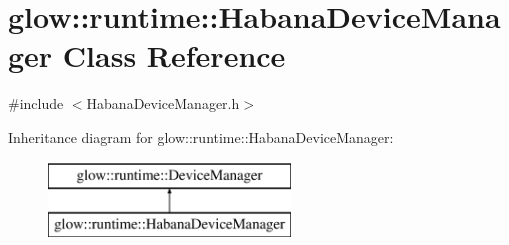 \hypertarget{classglow_1_1runtime_1_1_habana_device_manager}{}\section{glow\+:\+:runtime\+:\+:Habana\+Device\+Manager Class Reference}
\label{classglow_1_1runtime_1_1_habana_device_manager}


{\ttfamily \#include $<$Habana\+Device\+Manager.\+h$>$}

Inheritance diagram for glow\+:\+:runtime\+:\+:Habana\+Device\+Manager\+:\begin{figure}[H]
\begin{center}
\leavevmode
\includegraphics[height=2.000000cm]{classglow_1_1runtime_1_1_habana_device_manager}
\end{center}
\end{figure}
